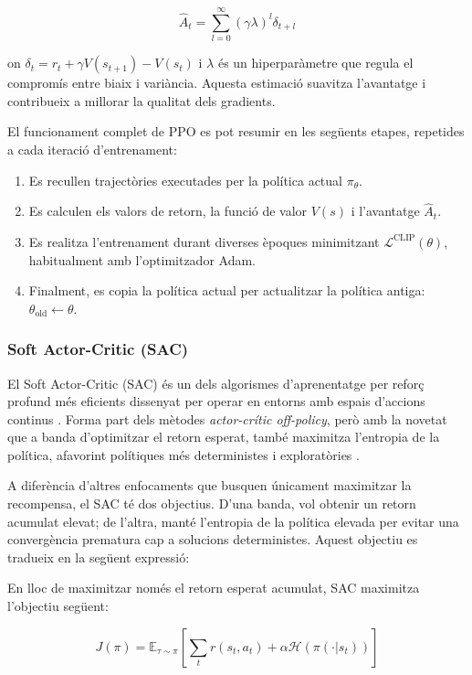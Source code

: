 \documentclass[12pt,a4paper,twoside]{book}
\begin{document}
\begin{equation}
\hat{A}_t = \sum_{l=0}^{\infty} (\gamma \lambda)^l \delta_{t+l}
\end{equation}

on $\delta_t = r_t + \gamma V(s_{t+1}) - V(s_t)$ i $\lambda$ és un hiperparàmetre que regula el compromís entre biaix i variància. Aquesta estimació suavitza l’avantatge i contribueix a millorar la qualitat dels gradients.


El funcionament complet de PPO es pot resumir en les següents etapes, repetides a cada iteració d’entrenament:
\begin{enumerate}
  \item Es recullen trajectòries executades per la política actual $\pi_\theta$.
  \item Es calculen els valors de retorn, la funció de valor $V(s)$ i l’avantatge $\hat{A}_t$.
  \item Es realitza l'entrenament durant diverses èpoques minimitzant $\mathcal{L}^{\text{CLIP}}(\theta)$, habitualment amb l’optimitzador Adam.
  \item Finalment, es copia la política actual per actualitzar la política antiga: $\theta_{\text{old}} \leftarrow \theta$.
\end{enumerate}


\subsubsection{Soft Actor-Critic (SAC)}

El Soft Actor-Critic (SAC) és un dels algorismes d'aprenentatge per reforç profund més eficients dissenyat per operar en entorns amb espais d'accions continus \cite{Haarnoja2018}. Forma part dels mètodes \textit{actor-crític off-policy}, però amb la novetat que a banda d'optimitzar el retorn esperat, també maximitza l'entropia de la política, afavorint polítiques més deterministes i exploratòries \cite{M11}.

A diferència d'altres enfocaments que busquen únicament maximitzar la recompensa, el SAC té dos objectius. D'una banda, vol obtenir un retorn acumulat elevat; de l’altra, manté l’entropia de la política elevada per evitar una convergència prematura cap a solucions deterministes. Aquest objectiu es tradueix en la següent expressió:

En lloc de maximitzar només el retorn esperat acumulat, SAC maximitza l'objectiu següent:

\begin{equation}
J(\pi) = \mathbb{E}_{\tau \sim \pi} \left[ \sum_t r(s_t, a_t) + \alpha \mathcal{H}(\pi(\cdot|s_t)) \right]
\end{equation}
\end{document}
